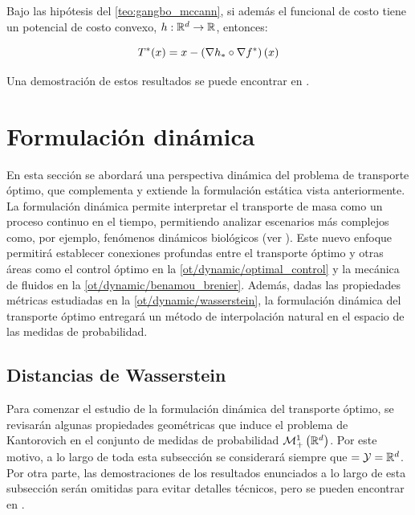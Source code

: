 \begin{cor}
	Bajo las hipótesis del \autoref{teo:gangbo_mccann}, si además el funcional de costo tiene un potencial de costo convexo, $h:\mathbb{R}^d\to\mathbb{R}$, entonces:

	\begin{equation*}
		T^*(x) = x - \left(\nabla h_* \circ \nabla f^*\right)(x)
	\end{equation*}
\end{cor}

Una demostración de estos resultados se puede encontrar en \cite{bunne2023optimal}.

\section{Formulación dinámica}
\label{ot/dynamic}

En esta sección se abordará una perspectiva dinámica del problema de transporte óptimo, que complementa y extiende la formulación estática vista anteriormente. La formulación dinámica permite interpretar el transporte de masa como un proceso continuo en el tiempo, permitiendo analizar escenarios más complejos como, por ejemplo, fenómenos dinámicos biológicos (ver \cite{Bunne2023}). Este nuevo enfoque permitirá establecer conexiones profundas entre el transporte óptimo y otras áreas como el control óptimo en la \autoref{ot/dynamic/optimal_control} y la mecánica de fluidos en la \autoref{ot/dynamic/benamou_brenier}. Además, dadas las propiedades métricas estudiadas en la \autoref{ot/dynamic/wasserstein}, la formulación dinámica del transporte óptimo entregará un método de interpolación natural en el espacio de las medidas de probabilidad.

\subsection{Distancias de Wasserstein}
\label{ot/dynamic/wasserstein}

Para comenzar el estudio de la formulación dinámica del transporte óptimo, se revisarán algunas propiedades geométricas que induce el problema de Kantorovich en el conjunto de medidas de probabilidad $\mathcal{M}_+^1\left(\mathbb{R}^d\right)$. Por este motivo, a lo largo de toda esta subsección se considerará siempre que $=\mathcal{Y}=\mathbb{R}^d$. Por otra parte, las demostraciones de los resultados enunciados a lo largo de esta subsección serán omitidas para evitar detalles técnicos, pero se pueden encontrar en \cite{villani2003topics}.

